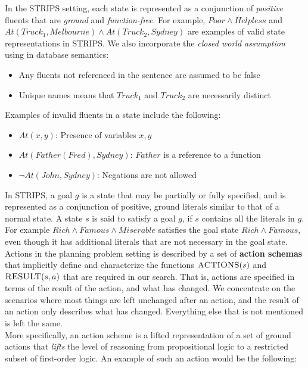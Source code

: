 \documentclass[11pt]{article}
\begin{document}
In the \textsc{STRIPS} setting, each state is represented as a conjunction of \textit{positive} fluents that are \textit{ground} and \textit{function-free}. For example, $Poor \land Helpless$ and $At(Truck_1, Melbourne) \land At(Truck_2, Sydney)$ are examples of valid state representations in \textsc{STRIPS}. We also incorporate the \textit{closed world assumption} using in database semantics:

\begin{itemize}
    \item Any fluents not referenced in the sentence are assumed to be false
    \item Unique names means that $Truck_1$ and $Truck_2$ are necessarily distinct
\end{itemize}

Examples of invalid fluents in a state include the following:

\begin{itemize}
    \item $At(x, y)$: Presence of variables $x, y$
    \item $At(Father(Fred), Sydney)$: $Father$ is a reference to a function
    \item $\lnot At(John, Sydney)$: Negations are not allowed
\end{itemize}

In \textsc{STRIPS}, a goal $g$ is a state that may be partially or fully specified, and is represented as a conjunction of positive, ground literals similar to that of a normal state. A state $s$ is said to satisfy a goal $g$, if $s$ contains all the literals in $g$. For example $Rich \land Famous \land Miserable$ satisfies the goal state $Rich \land Famous$, even though it has additional literals that are not necessary in the goal state.\\

Actions in the planning problem setting is described by a set of \textbf{action schemas} that implicitly define and characterize the functions $\textsc{ACTIONS}(s)$ and $\textsc{RESULT}(s, a)$ that are required in our search. That is, actions are specified in terms of the result of the action, and what has changed. We concentrate on the scenarios where most things are left unchanged after an action, and the result of an action only describes what has changed. Everything else that is not mentioned is left the same.\\

More specifically, an action scheme is a lifted representation of a set of ground actions that \textit{lifts} the level of reasoning from propositional logic to a restricted subset of first-order logic. An example of such an action would be the following:
\end{document}
